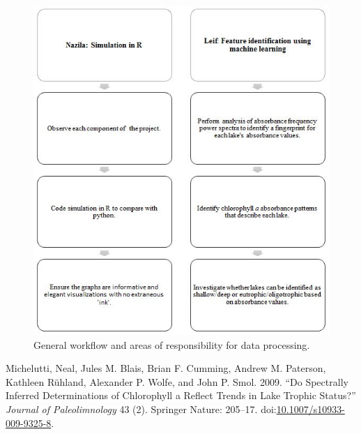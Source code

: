 \documentclass[]{article}
\begin{document}
\begin{figure}
\centering
\includegraphics{Figure 2.eps}
\caption{General workflow and areas of responsibility for data
processing.}
\end{figure}

\hypertarget{refs}{}
\hypertarget{ref-Michelutti_2009}{}
Michelutti, Neal, Jules M. Blais, Brian F. Cumming, Andrew M. Paterson,
Kathleen Rühland, Alexander P. Wolfe, and John P. Smol. 2009. ``Do
Spectrally Inferred Determinations of Chlorophyll a Reflect Trends in
Lake Trophic Status?'' \emph{Journal of Paleolimnology} 43 (2). Springer
Nature: 205--17.
doi:\href{https://doi.org/10.1007/s10933-009-9325-8}{10.1007/s10933-009-9325-8}.
\end{document}
